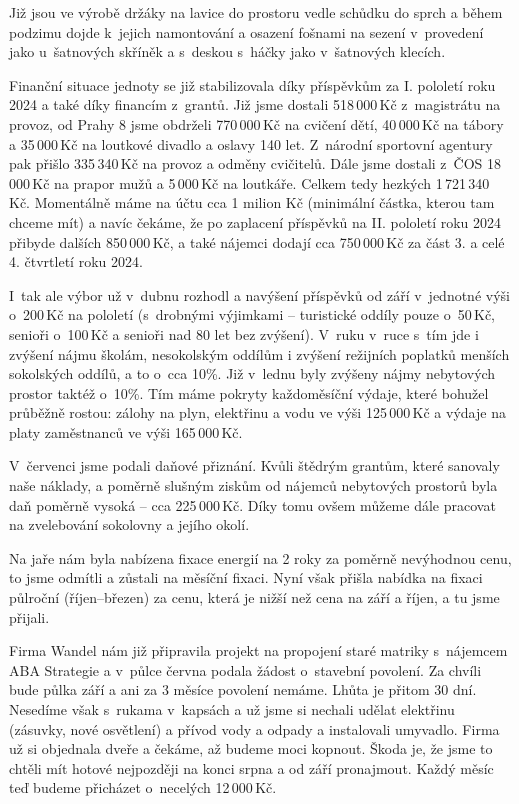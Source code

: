 \documentclass[11pt]{article}
\begin{document}
Již jsou ve výrobě držáky na lavice do prostoru vedle schůdku do sprch a během podzimu dojde k~jejich namontování a osazení fošnami na sezení v~provedení jako u~šatnových skříněk a s~deskou s~háčky jako v~šatnových klecích.

Finanční situace jednoty se již stabilizovala díky příspěvkům za I. pololetí roku 2024 a také díky financím z~grantů. Již jsme dostali 518\,000\,Kč z~magistrátu na provoz, od Prahy 8 jsme obdrželi 770\,000\,Kč na cvičení dětí, 40\,000\,Kč na tábory a 35\,000\,Kč na loutkové divadlo a oslavy 140 let. Z~národní sportovní agentury pak přišlo 335\,340\,Kč na provoz a odměny cvičitelů. Dále jsme dostali z~ČOS 18\,000\,Kč na prapor mužů a 5\,000\,Kč na loutkáře. Celkem tedy hezkých 1\,721\,340 Kč. Momentálně máme na účtu cca 1 milion Kč (minimální částka, kterou tam chceme mít) a navíc čekáme, že po zaplacení příspěvků na II. pololetí roku 2024 přibyde dalších 850\,000\,Kč, a také nájemci dodají cca 750\,000\,Kč za část 3. a celé 4. čtvrtletí roku 2024.

I~tak ale výbor už v~dubnu rozhodl a navýšení příspěvků od září v~jednotné výši o~200\,Kč na pololetí (s~drobnými výjimkami – turistické oddíly pouze o~50\,Kč, senioři o~100\,Kč a senioři nad 80 let bez zvýšení). V~ruku v~ruce s~tím jde i zvýšení nájmu školám, nesokolským oddílům i zvýšení režijních poplatků menších sokolských oddílů, a to o~cca 10\%. Již v~lednu byly zvýšeny nájmy nebytových prostor taktéž o~10\%. Tím máme pokryty každoměsíční výdaje, které bohužel průběžně rostou: zálohy na plyn, elektřinu a vodu ve výši 125\,000\,Kč a výdaje na platy zaměstnanců ve výši 165\,000\,Kč.

V~červenci jsme podali daňové přiznání. Kvůli štědrým grantům, které sanovaly naše náklady, a poměrně slušným ziskům od nájemců nebytových prostorů byla daň poměrně vysoká – cca 225\,000\,Kč. Díky tomu ovšem můžeme dále pracovat na zvelebování sokolovny a jejího okolí.

Na jaře nám byla nabízena fixace energií na 2 roky za poměrně nevýhodnou cenu, to jsme odmítli a zůstali na měsíční fixaci. Nyní však přišla nabídka na fixaci půlroční (říjen–březen) za cenu, která je nižší než cena na září a říjen, a tu jsme přijali.

Firma Wandel nám již připravila projekt na propojení staré matriky s~nájemcem ABA Strategie a v~půlce června podala žádost o~stavební povolení. Za chvíli bude půlka září a ani za 3 měsíce povolení nemáme. Lhůta je přitom 30 dní. Nesedíme však s~rukama v~kapsách a už jsme si nechali udělat elektřinu (zásuvky, nové osvětlení) a přívod vody a odpady a instalovali umyvadlo. Firma už si objednala dveře a čekáme, až budeme moci kopnout. Škoda je, že jsme to chtěli mít hotové nejpozději na konci srpna a od září pronajmout. Každý měsíc teď budeme přicházet o~necelých 12\,000\,Kč.
\end{document}
